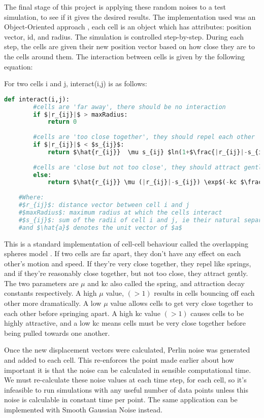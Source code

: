 \documentclass[11pt,a4paper]{article}
\begin{document}
The final stage of this project is applying these random noises to a test simulation, to see if it gives the desired results. The implementation used was an Object-Oriented approach \cite{oop}, each cell is an object which has attributes: position vector, id, and radius. The simulation is controlled step-by-step. During each step, the cells are given their new position vector based on how close they are to the cells around them. The interaction between cells is given by the following equation:

\vspace{.5cm}

\noindent
For two cells i and j, interact(i,j) is as follows:
\begin{lstlisting}[language=Python, mathescape=true]
	def interact(i,j):
		#cells are 'far away', there should be no interaction
		if $|r_{ij}|$ > maxRadius:
			return 0
		
		#cells are 'too close together', they should repel each other
		if $|r_{ij}|$ < $s_{ij}$:
			return $\hat{r_{ij}}  \mu s_{ij} $ln(1+$\frac{|r_{ij}|-s_{ij}}{s_{ij}})$
			
		#cells are 'close but not too close', they should attract gently
		else:
			return $\hat{r_{ij}} \mu (|r_{ij}|-s_{ij}) \exp$(-kc $\frac{	(|r_{ij}|-s_{ij})} {s_{ij}})$
		
	#Where:
	#$r_{ij}$: distance vector between cell i and j
	#$maxRadius$: maximum radius at which the cells interact
	#$s_{ij}$: sum of the radii of cell i and j, ie their natural separation
	#and $\hat{a}$ denotes the unit vector of $a$
\end{lstlisting}

This is a standard implementation of cell-cell behaviour called the overlapping spheres model \cite{springmodel}. If two cells are far apart, they don’t have any effect on each other’s motion and speed. If they’re very close together, they repel like springs, and if they’re reasonably close together, but not too close, they attract gently. The two parameters are $\mu$ and kc also called the spring, and attraction decay constants respectively. A high $\mu$ value, $(>1)$ results in cells bouncing off each other more dramatically. A low $\mu$ value allows cells to get very close together to each other before springing apart. A high kc value $(>1)$ causes cells to be highly attractive, and a low kc means cells must be very close together before being pulled towards one another.

Once the new displacement vectors were calculated, Perlin noise was generated and added to each cell. This re-enforces the point made earlier about how important it is that the noise can be calculated in sensible computational time. We must re-calculate these noise values at each time step, for each cell, so it’s infeasible to run simulations with any useful number of data points unless this noise is calculable in constant time per point. The same application can be implemented with Smooth Gaussian Noise instead.
\end{document}
